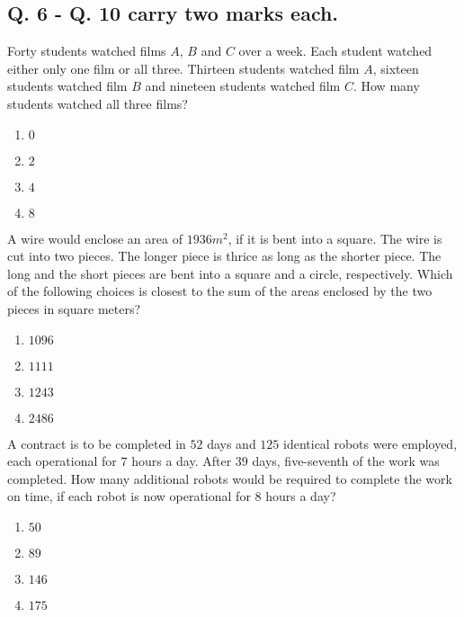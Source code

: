 \subsection{\textbf{Q. 6 - Q. 10 carry two marks each.}}
\item Forty students watched films $A$, $B$ and $C$ over a week. Each student watched either only
one film or all three. Thirteen students watched film $A$, sixteen students watched film $B$
and nineteen students watched film $C$. How many students watched all three films?
\begin{multicols}{4}
    \begin{enumerate}
        \item $0$ \item $2$ \item $4$ \item $8$
    \end{enumerate}
\end{multicols}
\item A wire would enclose an area of $1936 m^2$, if it is bent into a square. The wire is cut into
two pieces. The longer piece is thrice as long as the shorter piece. The long and the short
pieces are bent into a square and a circle, respectively. Which of the following choices is
closest to the sum of the areas enclosed by the two pieces in square meters?
\begin{multicols}{4}
    \begin{enumerate}
        \item  $1096$ \item  $1111$ \item  $1243$ \item  $2486$
    \end{enumerate}
\end{multicols}
\item A contract is to be completed in $52$ days and $125$ identical robots were employed, each
operational for $7$ hours a day. After $39$ days, five-seventh of the work was completed. How
many additional robots would be required to complete the work on time, if each robot is
now operational for $8$ hours a day?
\begin{multicols}{4}
    \begin{enumerate}
        \item $50$
        \item $89$
        \item $146$
        \item $175$
    \end{enumerate}
\end{multicols}
